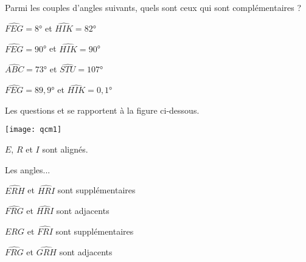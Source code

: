 
\begin{QCM}

\begin{GroupeQCM}


\begin{exercice}
Parmi les couples d'angles suivants, quels sont ceux qui sont complémentaires ?
\begin{ChoixQCM}{2}
\item $\widehat{FEG}=8$° et $\widehat{HIK}=82$°
\item $\widehat{FEG}=90$° et $\widehat{HIK}=90$°
\item $\widehat{ABC}=73$° et $\widehat{STU}=107$°
\item $\widehat{FEG}=89,9$° et $\widehat{HIK}=0,1$°
\end{ChoixQCM}
\begin{corrige}
\end{corrige}
\end{exercice}
\end{GroupeQCM}



\begin{EnonceCommunQCM}
Les questions  et  se rapportent à la figure ci-dessous.
\begin{center}
    \texttt{[image: qcm1]}
    
    $E$, $R$ et $I$ sont alignés.
\end{center}
\end{EnonceCommunQCM}

\begin{GroupeQCM}


\begin{exercice}\label{Aqcm1}
Les angles...
\begin{ChoixQCM}{2}
\item $\widehat{ERH}$ et $\widehat{HRI}$ sont supplémentaires
\item $\widehat{FRG}$ et $\widehat{HRI}$ sont adjacents
\item $\widehat{ERG}$ et $\widehat{FRI}$ sont supplémentaires
\item $\widehat{FRG}$ et $\widehat{GRH}$ sont adjacents
\end{ChoixQCM}
\begin{corrige}
\end{corrige}
\end{exercice}






\end{GroupeQCM}
\end{QCM}
